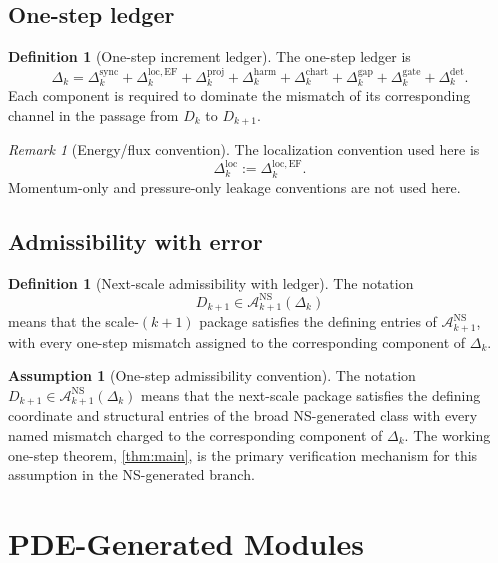\documentclass[11pt]{article}
\numberwithin{equation}{section}
\theoremstyle{plain}
\theoremstyle{definition}
\newtheorem{definition}[theorem]{Definition}
\newtheorem{assumption}[theorem]{Assumption}
\theoremstyle{remark}
\newtheorem{remark}[theorem]{Remark}
\newcommand{\NS}{\mathrm{NS}}
\newcommand{\harm}{\mathrm{harm}}
\newcommand{\proj}{\mathrm{proj}}
\newcommand{\sync}{\mathrm{sync}}
\newcommand{\gate}{\mathrm{gate}}
\newcommand{\detc}{\mathrm{det}}
\newcommand{\chart}{\mathrm{chart}}
\newcommand{\gap}{\mathrm{gap}}
\newcommand{\EF}{\mathrm{EF}}
\newcommand{\A}{\mathcal A}
\begin{document}
\subsection{One-step ledger}

\begin{definition}[One-step increment ledger]\label{def:one-step-ledger}
The one-step ledger is
\[
  \Delta_k
  =
  \Delta_k^{\sync}
  +\Delta_k^{\mathrm{loc},\EF}
  +\Delta_k^{\proj}
  +\Delta_k^{\harm}
  +\Delta_k^{\chart}
  +\Delta_k^{\gap}
  +\Delta_k^{\gate}
  +\Delta_k^{\detc}.
\]
Each component is required to dominate the mismatch of its corresponding
channel in the passage from \(D_k\) to \(D_{k+1}\).
\end{definition}

\begin{remark}[Energy/flux convention]
The localization convention used here is
\[
  \Delta_k^{\mathrm{loc}}
  :=
  \Delta_k^{\mathrm{loc},\EF}.
\]
Momentum-only and pressure-only leakage conventions are not used here.
\end{remark}

\subsection{Admissibility with error}

\begin{definition}[Next-scale admissibility with ledger]
\label{def:admissibility-with-ledger}
The notation
\[
  D_{k+1}\in\A_{k+1}^{\NS}(\Delta_k)
\]
means that the scale-\((k+1)\) package satisfies the defining entries of
\(\A_{k+1}^{\NS}\), with every one-step mismatch assigned to the corresponding
component of \(\Delta_k\).
\end{definition}



\begin{assumption}[One-step admissibility convention]\label{ass:one-step-adm}
The notation \(D_{k+1}\in\A_{k+1}^{\NS}(\Delta_k)\) means that the next-scale package satisfies the defining coordinate and structural entries of the broad NS-generated class with every named mismatch charged to the corresponding component of \(\Delta_k\).  The working one-step theorem, \cref{thm:main}, is the primary verification mechanism for this assumption in the NS-generated branch.
\end{assumption}

\section{PDE-Generated Modules}
\label{sec:pde}
\end{document}
